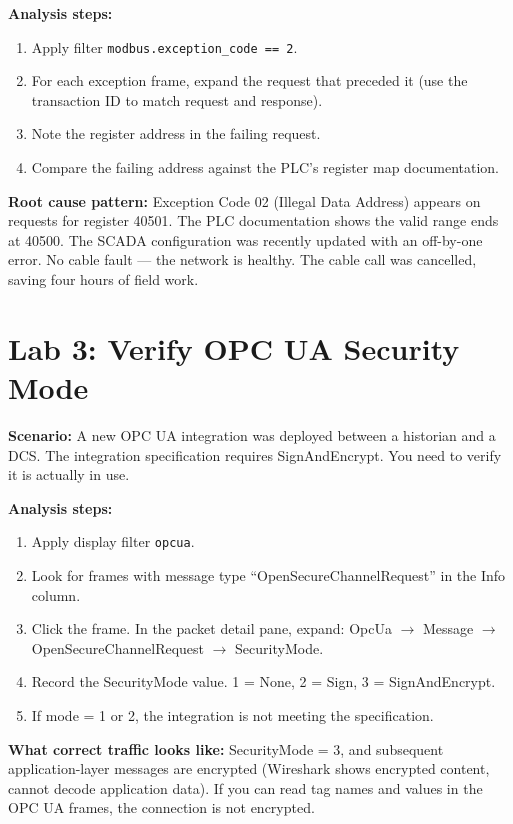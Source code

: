\documentclass[12pt,twoside,openright]{memoir}
\newcommand{\filter}[1]{\texttt{\color{wsblue}#1}}
\begin{document}
\textbf{Analysis steps:}
\begin{enumerate}[noitemsep]
  \item Apply filter \filter{modbus.exception\_code == 2}.
  \item For each exception frame, expand the request that preceded it (use the transaction ID to match request and response).
  \item Note the register address in the failing request.
  \item Compare the failing address against the PLC's register map documentation.
\end{enumerate}

\textbf{Root cause pattern:} Exception Code 02 (Illegal Data Address) appears on requests for register 40501. The PLC documentation shows the valid range ends at 40500. The SCADA configuration was recently updated with an off-by-one error. No cable fault --- the network is healthy. The cable call was cancelled, saving four hours of field work.

\section{Lab 3: Verify OPC UA Security Mode}

\textbf{Scenario:} A new OPC UA integration was deployed between a historian and a DCS. The integration specification requires SignAndEncrypt. You need to verify it is actually in use.

\textbf{Analysis steps:}
\begin{enumerate}[noitemsep]
  \item Apply display filter \filter{opcua}.
  \item Look for frames with message type ``OpenSecureChannelRequest'' in the Info column.
  \item Click the frame. In the packet detail pane, expand: OpcUa $\to$ Message $\to$ OpenSecureChannelRequest $\to$ SecurityMode.
  \item Record the SecurityMode value. 1 = None, 2 = Sign, 3 = SignAndEncrypt.
  \item If mode = 1 or 2, the integration is not meeting the specification.
\end{enumerate}

\textbf{What correct traffic looks like:} SecurityMode = 3, and subsequent application-layer messages are encrypted (Wireshark shows encrypted content, cannot decode application data). If you can read tag names and values in the OPC UA frames, the connection is not encrypted.
\end{document}

